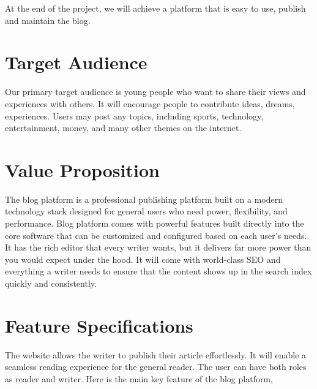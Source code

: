 \documentclass{article}
\begin{document}
\noindent At the end of the project, we will achieve a platform that is easy to use, publish and maintain the blog.

\noindent 

\noindent \section{Target Audience}

\noindent Our primary target audience is young people who want to share their views and experiences with others. It will encourage people to contribute ideas, dreams, experiences. Users may post any topics, including sports, technology, entertainment, money, and many other themes on the internet.

\noindent 

\newpage

\noindent \section{Value Proposition}

\noindent The blog platform is a professional publishing platform built on a modern technology stack designed for general users who need power, flexibility, and performance. Blog platform comes with powerful features built directly into the core software that can be customized and configured based on each user's needs. It has the rich editor that every writer wants, but it delivers far more power than you would expect under the hood. It will come with world-class SEO and everything a writer needs to ensure that the content shows up in the search index quickly and consistently.

\noindent

\noindent \section{Feature Specifications}

\noindent The website allows the writer to publish their article effortlessly. It will enable a seamless reading experience for the general reader. The user can have both roles as reader and writer. Here is the main key feature of the blog platform,
\end{document}
